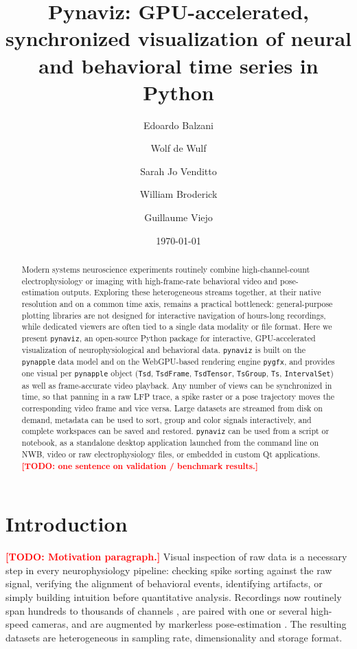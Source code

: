\documentclass[11pt]{article}
\title{Pynaviz: GPU-accelerated, synchronized visualization of neural and behavioral time series in Python}
\author[1]{Edoardo Balzani}
\author[1]{Wolf de Wulf}
\author[1]{Sarah Jo Venditto}
\author[1]{William Broderick}
\author[1]{Guillaume Viejo}
\affil[1]{Center for Computational Neuroscience, Flatiron Institute}
\date{\today}
\newcommand{\todo}[1]{\textcolor{red}{\textbf{[TODO: #1]}}}
\newcommand{\pynaviz}{\texttt{pynaviz}}
\newcommand{\pynapple}{\texttt{pynapple}}
\begin{document}
\maketitle

\begin{abstract}
Modern systems neuroscience experiments routinely combine high-channel-count
electrophysiology or imaging with high-frame-rate behavioral video and
pose-estimation outputs. Exploring these heterogeneous streams together, at
their native resolution and on a common time axis, remains a practical
bottleneck: general-purpose plotting libraries are not designed for
interactive navigation of hours-long recordings, while dedicated viewers are
often tied to a single data modality or file format. Here we present
\pynaviz{}, an open-source Python package for interactive, GPU-accelerated
visualization of neurophysiological and behavioral data. \pynaviz{} is built
on the \pynapple{} data model \citep{viejo2023pynapple} and on the
WebGPU-based rendering engine \texttt{pygfx}, and provides one visual per
\pynapple{} object (\texttt{Tsd}, \texttt{TsdFrame}, \texttt{TsdTensor},
\texttt{TsGroup}, \texttt{Ts}, \texttt{IntervalSet}) as well as
frame-accurate video playback. Any number of views can be synchronized in
time, so that panning in a raw LFP trace, a spike raster or a pose trajectory
moves the corresponding video frame and vice versa. Large datasets are
streamed from disk on demand, metadata can be used to sort, group and color
signals interactively, and complete workspaces can be saved and restored. \pynaviz{}
can be used from a script or notebook, as a standalone desktop application
launched from the command line on NWB, video or raw electrophysiology files,
or embedded in custom Qt applications.
\todo{one sentence on validation / benchmark results.}
\end{abstract}

\section{Introduction}
\label{sec:intro}

\todo{Motivation paragraph.} Visual inspection of raw data is a necessary
step in every neurophysiology pipeline: checking spike sorting against the
raw signal, verifying the alignment of behavioral events, identifying
artifacts, or simply building intuition before quantitative analysis.
Recordings now routinely span hundreds to thousands of channels
\citep{jun2017neuropixels,steinmetz2021neuropixels}, are paired with one or
several high-speed cameras, and are augmented by markerless pose-estimation
\citep{mathis2018deeplabcut,pereira2022sleap}. The resulting datasets are
heterogeneous in sampling rate, dimensionality and storage format.
\end{document}
